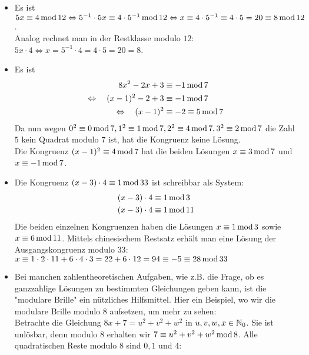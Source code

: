 	\begin{itemize}
		\item Es ist $5x \equiv 4 \operatorname{mod} 12 \Leftrightarrow 5^{-1} \cdot 5x \equiv 4 \cdot 5^{-1} \operatorname{mod} 12 \Leftrightarrow x \equiv 4 \cdot 5^{-1} \equiv 4 \cdot 5 = 20 \equiv 8 \operatorname{mod} 12$. \\
		Analog rechnet man in der Restklasse modulo $12$: \\
		$5x \cdot 4 \Leftrightarrow x = 5^{-1} \cdot 4 = 4 \cdot 5 = 20 = 8$.
		\item Es ist
		\begin{equation}
		\begin{aligned}
			8x^2 - 2x + 3 &\equiv -1 \operatorname{mod} 7 \\
			\Leftrightarrow \quad (x-1)^2 - 2 +3 &\equiv -1 \operatorname{mod} 7 \\
			\Leftrightarrow \quad (x-1)^2 &\equiv -2 \equiv 5 \operatorname{mod} 7
		\end{aligned}
		\end{equation}
		Da nun wegen $0^2 \equiv 0 \operatorname{mod} 7, 1^2 \equiv 1 \operatorname{mod} 7, 2^2 \equiv 4 \operatorname{mod} 7, 3^2 \equiv 2 \operatorname{mod} 7$ die Zahl $5$ kein Quadrat modulo $7$ ist, hat die Kongruenz keine Lösung.  \\
		Die Kongruenz $(x-1)^2 \equiv 4 \operatorname{mod} 7$ hat die beiden Lösungen $x \equiv 3 \operatorname{mod} 7$ und $x \equiv -1 \operatorname{mod} 7$.
		\item Die Kongruenz $(x-3) \cdot 4 \equiv 1 \operatorname{mod} 33$ ist schreibbar als System:
		\begin{equation}
		\begin{aligned}
			(x-3) \cdot 4 &\equiv 1 \operatorname{mod} 3 \\
			(x-3) \cdot 4 &\equiv 1 \operatorname{mod} 11
		\end{aligned}
		\end{equation}
		Die beiden einzelnen Kongruenzen haben die Lösungen $x \equiv 1 \operatorname{mod} 3$ sowie $x \equiv 6 \operatorname{mod} 11$. Mittels chinesischem Restsatz erhält man eine Lösung der Ausgangskongruenz modulo $33$: \\
		$x \equiv 1 \cdot 2 \cdot 11 + 6 \cdot 4 \cdot 3 = 22 + 6 \cdot 12 = 94 \equiv -5 \equiv 28 \operatorname{mod} 33$
		\item Bei manchen zahlentheoretischen Aufgaben, wie z.B. die Frage, ob es ganzzahlige Lösungen zu bestimmten Gleichungen geben kann, ist die "modulare Brille" ein nützliches Hilfsmittel. Hier ein Beispiel, wo wir die modulare Brille modulo $8$ aufsetzen, um mehr zu sehen: \\
		Betrachte die Gleichung $8x + 7 = u^2 + v^2 + w^2$ in $u,v,w,x \in \mathbb{N}_0$. Sie ist unlösbar, denn modulo $8$ erhalten wir $7 \equiv u^2 + v^2 + w^2 \operatorname{mod} 8$. Alle quadratischen Reste modulo $8$ sind $0, 1$ und $4$:

\end{itemize}
